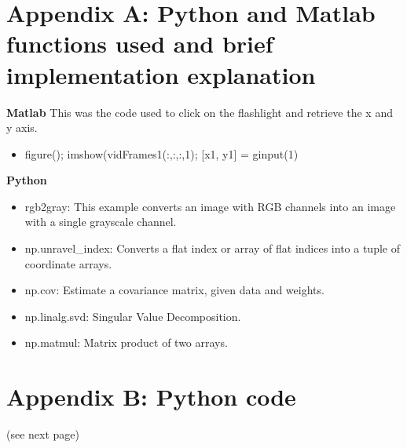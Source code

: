 \documentclass{cup-pan}
\begin{document}
\section{Appendix A: Python and Matlab functions used and brief implementation explanation}
\textbf{Matlab}
This was the code used to click on the flashlight and retrieve the x and y axis.
\begin{itemize}
	\item figure(); imshow(vidFrames1(:,:,:,1); [x1, y1] = ginput(1)
\end{itemize}
\noindent
\textbf{Python}
\begin{itemize}
	\item rgb2gray: This example converts an image with RGB channels into an image with a single grayscale channel. \\
	\item np.unravel\_index: Converts a flat index or array of flat indices into a tuple of coordinate arrays. \\
	\item np.cov: Estimate a covariance matrix, given data and weights. \\
	\item np.linalg.svd: Singular Value Decomposition.\\ 
	\item np.matmul: Matrix product of two arrays.\\
\end{itemize}
\section{Appendix B: Python code}
\noindent
(see next page)
\end{document}
